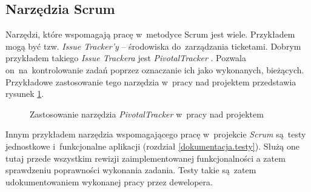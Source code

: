 \subsection{Narzędzia Scrum} \label{scrum.narzedzia}

Narzędzi, które wspomagają pracę w~metodyce Scrum jest wiele. Przykładem mogą być tzw. \textit{Issue Tracker'y} -- środowiska do~zarządzania ticketami. Dobrym przykładem takiego \textit{Issue Trackera} jest \textit{PivotalTracker} \cite{pivotaltracker}. Pozwala on~na~kontrolowanie zadań poprzez oznaczanie ich jako wykonanych, bieżących. Przykładowe zastosowanie tego narzędzia w~pracy nad projektem przedstawia rysunek \ref{fig.rysunek.pivotal}.

\begin{figure}[!t]
\centering
{}
\caption[Narzędzie \textit{PivotalTracker}]{Zastosowanie narzędzia \textit{PivotalTracker} w~pracy nad projektem \cite{pivotaltracker}}
\label{fig.rysunek.pivotal}
\end{figure}

Innym przykładem narzędzia wspomagającego pracę w~projekcie \textit{Scrum} są~testy jednostkowe i~funkcjonalne aplikacji (rozdział \ref{dokumentacja.testy}). Służą one tutaj przede wszystkim rewizji zaimplementowanej funkcjonalności a zatem sprawdzeniu poprawności wykonania zadania. Testy takie są~zatem udokumentowaniem wykonanej pracy przez dewelopera.

